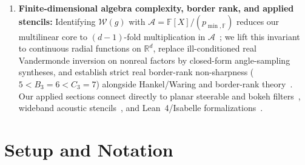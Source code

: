 \documentclass[11pt,a4paper]{article}
\theoremstyle{plain}
\theoremstyle{definition}
\newcommand{\R}{\mathbb{R}}
\newcommand{\Field}{\mathbb{F}}
\begin{document}
\begin{enumerate}[leftmargin=1.8em,itemsep=2pt]
  \item \textbf{Finite-dimensional algebra complexity, border rank, and applied stencils:} Identifying $\mathcal{W}(g)$ with $\mathcal{A} = \Field[X]/(p_{\min,\Field})$ reduces our multilinear core to $(d - 1)$-fold multiplication in $\mathcal{A}$~\cite{winograd1977some,fiduccia1977linear,alder1981alg,blaser2000lower,burgisser1997algebraic,blaser2023multilinear}; we lift this invariant to continuous radial functions on $\R^d$, replace ill-conditioned real Vandermonde inversion on nonreal factors by closed-form angle-sampling syntheses, and establish strict real border-rank non-sharpness ($5 < B_3 = 6 < C_3 = 7$) alongside Hankel/Waring and border-rank theory~\cite{comon1996decomposition,iarrobino1999power,kruskal1977three,nie2019hankel,comon2008symmetric,desilva2008tensor,reznick2013length,blekherman2015typical,buczynski2013ranks,zuiddam2017note,chang2026border}. Our applied sections connect directly to planar steerable and bokeh filters~\cite{treitel1971design,freeman1991steerable,koenderink1992generic,perona1995deformable,bigun2004linear,reisert2008complex,unser2013steerable,niemitalo2010blur,garcia2017circular,niemitalo2019angle,niemitalo2019beachball,niemitalo2019lowpass,niemitalo_kernel_optimizer}, wideband acoustic stencils~\cite{tam1993dispersion,tabei2002kspace,kowalczyk2011room,vanmourik2014explicit,hamilton2016optimised,hamilton2017fdtd,fomel2013lowrank}, and Lean~4/Isabelle formalizations~\cite{moura2021lean4,mathlib2020,dupuis2022formalized,fleuriot2000mechanizing,holzl2013type,bentkamp2019formal,jain2026octonion,yang2026matrix}.
\end{enumerate}

\section{Setup and Notation}\label{sec:formulation}
\end{document}
